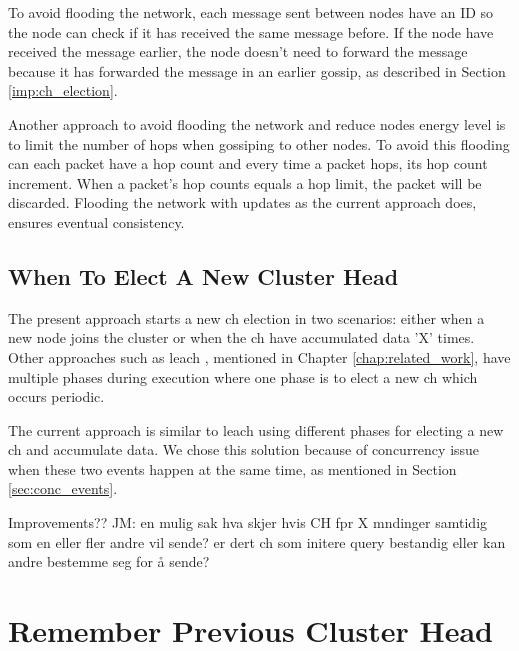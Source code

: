 \documentclass[USenglish]{uit-thesis}
\begin{document}
To avoid flooding the network, each message sent between nodes have an ID so the node can check if it has received the same message before. If the node have received the message earlier, the node doesn't need to forward the message because it has forwarded the message in an earlier gossip, as described in Section \ref{imp:ch_election}.

Another approach to avoid flooding the network and reduce nodes energy level is to limit the number of hops when gossiping to other nodes. To avoid this flooding can each packet have a hop count and every time a packet hops, its hop count increment. When a packet's hop counts equals a hop limit, the packet will be discarded. Flooding the network with updates as the current approach does, ensures eventual consistency.
 
 
\subsection{When To Elect A New Cluster Head}
The present approach starts a new \gls{ch} election in two scenarios: either when a new node joins the cluster or when the \gls{ch} have accumulated data 'X' times.
Other approaches such as \gls{leach} \cite{leach}, mentioned in Chapter \ref{chap:related_work}, have multiple phases during execution where one phase is to elect a new \gls{ch} which occurs periodic.

The current approach is similar to \gls{leach} using different phases for electing a new \gls{ch} and accumulate data. We chose this solution because of concurrency issue when these two events happen at the same time, as mentioned in Section \ref{sec:conc_events}. 

Improvements??
JM: en mulig sak hva skjer hvis CH fpr X mndinger samtidig som en eller fler andre vil sende? er dert ch som initere query bestandig eller kan andre bestemme seg for å sende?


\section{Remember Previous Cluster Head}
\end{document}
